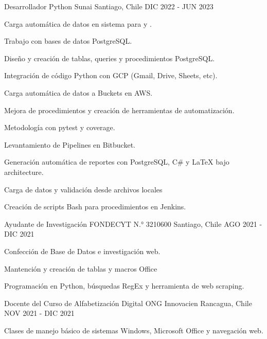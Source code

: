 \begin{cventries}
\cventry
  {Desarrollador Python} %
  {Sunai} %
  {Santiago, Chile} %
  {DIC 2022 - JUN 2023} %
  {
    \begin{cvitems} %
      \item {Carga automática de datos en sistema  para  y .}
      \item {Trabajo con bases de datos PostgreSQL.}
      \item {Diseño y creación de tablas, queries y procedimientos PostgreSQL.}
      \item {Integración de código Python con GCP (Gmail, Drive, Sheets, etc).}
      \item {Carga automática de datos a Buckets en AWS.}
      \item {Mejora de procedimientos y creación de herramientas de automatización.}
      \item {Metodología  con pytest y coverage.}
      \item {Levantamiento de Pipelines en Bitbucket.}
      \item {Generación automática de reportes con PostgreSQL, C\# y LaTeX bajo  architecture.}
      \item {Carga de datos y validación desde archivos  locales}
      \item {Creación de scripts Bash para procedimientos en Jenkins.}
    \end{cvitems}
  }

  \cventry
    {Ayudante de Investigación} %
    {FONDECYT N.° 3210600} %
    {Santiago, Chile} %
    {AGO 2021 - DIC 2021} %
    {
      \begin{cvitems} %
        \item {Confección de Base de Datos e investigación web.}
        \item {Mantención y creación de tablas y macros Office}
        \item {Programación en Python, búsquedas RegEx y herramienta de web scraping.}
      \end{cvitems}
    }

  \cventry
    {Docente del Curso de Alfabetización Digital} %
    {ONG Innovacien} %
    {Rancagua, Chile} %
    {NOV 2021 - DIC 2021} %
    {
      \begin{cvitems} %
        \item {Clases de manejo básico de sistemas Windows, Microsoft Office y navegación web.}
      \end{cvitems}
    }


\end{cventries}
